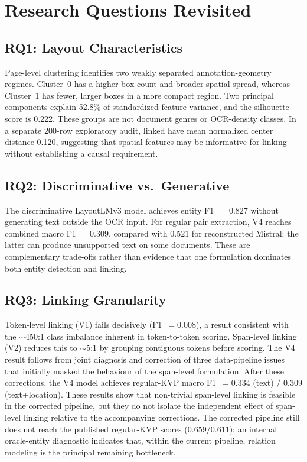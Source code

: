 \section{Research Questions Revisited}
\label{sec:rq_revisited}

\subsection{RQ1: Layout Characteristics}
Page-level clustering identifies two weakly separated annotation-geometry
regimes. Cluster~0 has a higher box count and broader spatial spread, whereas
Cluster~1 has fewer, larger boxes in a more compact region. Two principal
components explain 52.8\% of standardized-feature variance, and the silhouette
score is 0.222. These groups are not document genres or OCR-density classes.
In a separate 200-row exploratory audit, linked \kvps{} have mean normalized
center distance 0.120, suggesting that spatial features may be informative for
linking without establishing a causal requirement.

\subsection{RQ2: Discriminative vs.\ Generative}
The discriminative LayoutLMv3 model achieves entity F1~$=0.827$ without
generating text outside the OCR input. For regular pair extraction, V4 reaches
combined macro F1 $=0.309$, compared with $0.521$ for reconstructed Mistral;
the latter can produce unsupported text on some documents.
These are complementary trade-offs rather than evidence that one formulation
dominates both entity detection and linking.

\subsection{RQ3: Linking Granularity}
Token-level linking (V1) fails decisively (F1~$= 0.008$), a result consistent
with the $\sim$450:1 class imbalance inherent in token-to-token scoring.
Span-level linking (V2) reduces this to $\sim$5:1 by grouping contiguous
tokens before scoring. The V4 result follows from joint diagnosis and
correction of three data-pipeline issues that initially masked the behaviour
of the span-level formulation. After these corrections, the V4 model achieves
regular-KVP macro F1~$=0.334$ (text) / $0.309$ (text+location).
These results show that non-trivial span-level linking is feasible in the
corrected pipeline, but they do not isolate the independent effect of
span-level linking relative to the accompanying corrections. The corrected
pipeline still does not reach the published regular-KVP scores
($0.659/0.611$); an internal oracle-entity diagnostic indicates that, within
the current pipeline, relation modeling is the principal remaining
bottleneck.

